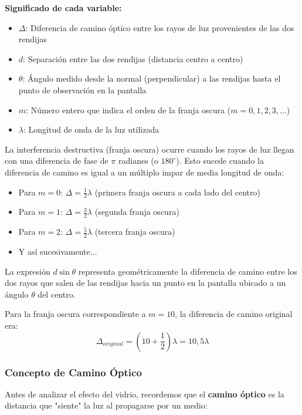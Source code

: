 \documentclass[
  11pt,
  letterpaper,
   addpoints,
   answers
  ]{exam}
\begin{document}
\begin{questions}
\begin{solution}
\textbf{Significado de cada variable:}
\begin{itemize}
    \item $\Delta$: Diferencia de camino óptico entre los rayos de luz provenientes de las dos rendijas
    \item $d$: Separación entre las dos rendijas (distancia centro a centro)
    \item $\theta$: Ángulo medido desde la normal (perpendicular) a las rendijas hasta el punto de observación en la pantalla
    \item $m$: Número entero que indica el orden de la franja oscura ($m = 0, 1, 2, 3, ...$)
    \item $\lambda$: Longitud de onda de la luz utilizada
\end{itemize}

La interferencia destructiva (franja oscura) ocurre cuando los rayos de luz llegan con una diferencia de fase de $\pi$ radianes (o $180^{\circ}$). Esto sucede cuando la diferencia de camino es igual a un múltiplo impar de media longitud de onda:

\begin{itemize}
    \item Para $m = 0$: $\Delta = \frac{1}{2}\lambda$ (primera franja oscura a cada lado del centro)
    \item Para $m = 1$: $\Delta = \frac{3}{2}\lambda$ (segunda franja oscura)
    \item Para $m = 2$: $\Delta = \frac{5}{2}\lambda$ (tercera franja oscura)
    \item Y así sucesivamente...
\end{itemize}

La expresión $d \sin \theta$ representa geométricamente la diferencia de camino entre los dos rayos que salen de las rendijas hacia un punto en la pantalla ubicado a un ángulo $\theta$ del centro.

Para la franja oscura correspondiente a $m = 10$, la diferencia de camino original era:
\begin{equation}
\Delta_{original} = \left(10 + \frac{1}{2}\right) \lambda = 10{,}5 \lambda
\end{equation}

\subsubsection*{Concepto de Camino Óptico}

Antes de analizar el efecto del vidrio, recordemos que el \textbf{camino óptico} es la distancia que "siente" la luz al propagarse por un medio:


\end{solution}
\end{questions}
\end{document}
